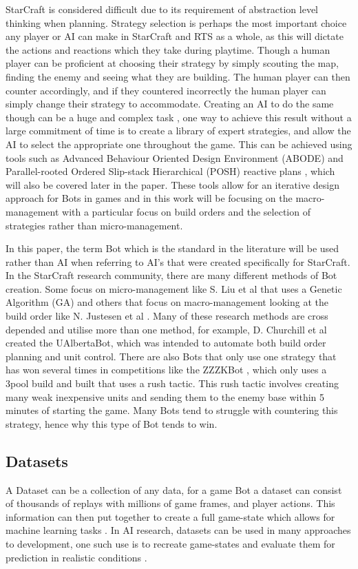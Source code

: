 \documentclass[journal]{IEEEtran}
\begin{document}
	StarCraft is considered difficult due to its requirement of abstraction level thinking when planning. Strategy selection is perhaps the most important choice any player or AI can make in StarCraft and RTS as a whole, as this will dictate the actions and reactions which they take during playtime. Though a human player can be proficient at choosing their strategy by simply scouting the map, finding the enemy and seeing what they are building. The human player can then counter accordingly, and if they countered incorrectly the human player can simply change their strategy to accommodate. Creating an AI to do the same though can be a huge and complex task \cite{Fuzzy,OnlineEvo,GoalDriven}, one way to achieve this result without a large commitment of time is to create a library of expert strategies, and allow the AI to select the appropriate one throughout the game. This can be achieved using tools such as Advanced Behaviour Oriented Design Environment (ABODE) and Parallel-rooted Ordered Slip-stack Hierarchical (POSH) reactive plans \cite{POSH}, which will also be covered later in the paper. These tools allow for an iterative design approach for Bots in games and in this work will be focusing on the macro-management with a particular focus on build orders and the selection of strategies rather than micro-management. 
	
	In this paper, the term Bot which is the standard in the literature will be used rather than AI when referring to AI's that were created specifically for StarCraft. In the StarCraft research community, there are many different methods of Bot creation. Some focus on micro-management like S. Liu et al \cite{EffectiveMicro} that uses a Genetic Algorithm (GA) and others that focus on macro-management looking at the build order like N. Justesen et al \cite{OnlineEvo}. Many of these research methods are cross depended and utilise more than one method, for example, D. Churchill et al \cite{Agents} created the UAlbertaBot, which was intended to automate both build order planning and unit control. There are also Bots that only use one strategy that has won several times in competitions like the ZZZKBot \cite{ZZZK,Results}, which only uses a 3pool build and built that uses a rush tactic. This rush tactic involves creating many weak inexpensive units and sending them to the enemy base within 5 minutes of starting the game. Many Bots tend to struggle with countering this strategy, hence why this type of Bot tends to win.
	
	\subsection{Datasets}
	A Dataset can be a collection of any data, for a game Bot a dataset can consist of thousands of replays with millions of game frames, and player actions\cite{Dataset}. This information can then put together to create a full game-state which allows for machine learning tasks \cite{Dataset17}. In AI research, datasets can be used in many approaches to development, one such use is to recreate game-states and evaluate them for prediction in realistic conditions \cite{SpecialTactics}.
	
\end{document}

